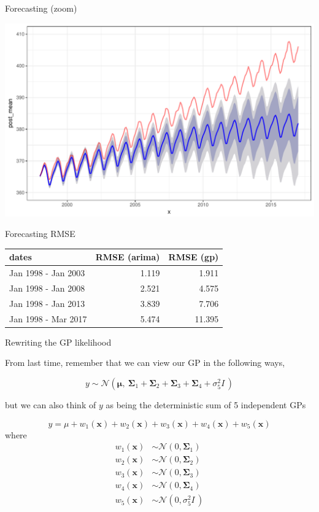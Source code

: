 \documentclass[11pt,ignorenonframetext,]{beamer}
\begin{document}
\begin{frame}{Forecasting (zoom)}

\includegraphics{Lec15_files/figure-beamer/unnamed-chunk-17-1.pdf}

\end{frame}

\begin{frame}{Forecasting RMSE}

\begin{longtable}[]{@{}lrr@{}}
\toprule
dates & RMSE (arima) & RMSE (gp)\tabularnewline
\midrule
\endhead
Jan 1998 - Jan 2003 & 1.119 & 1.911\tabularnewline
Jan 1998 - Jan 2008 & 2.521 & 4.575\tabularnewline
Jan 1998 - Jan 2013 & 3.839 & 7.706\tabularnewline
Jan 1998 - Mar 2017 & 5.474 & 11.395\tabularnewline
\bottomrule
\end{longtable}

\end{frame}

\begin{frame}[t]{Rewriting the GP likelihood}

From last time, remember that we can view our GP in the following ways,

\[ y \sim \mathcal{N}(\bm\mu,~ \bm\Sigma_1 + \bm\Sigma_2 + \bm\Sigma_3 + \bm\Sigma_4 + \sigma^2_5 \mathit{I}\,) \]

but we can also think of \(y\) as being the deterministic sum of 5
independent GPs

\[ y = \mu + w_1(\bm{x}) + w_2(\bm{x}) + w_3(\bm{x}) + w_4(\bm{x}) + w_5(\bm{x}) \]
where \[
\begin{aligned}
w_1(\bm{x}) &\sim \mathcal{N}(0, \bm\Sigma_1) \\
w_2(\bm{x}) &\sim \mathcal{N}(0, \bm\Sigma_2) \\
w_3(\bm{x}) &\sim \mathcal{N}(0, \bm\Sigma_3) \\
w_4(\bm{x}) &\sim \mathcal{N}(0, \bm\Sigma_4) \\
w_5(\bm{x}) &\sim \mathcal{N}(0, \sigma^2_5 \mathit{I}\,)
\end{aligned}
\]

\end{frame}
\end{document}
